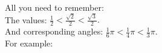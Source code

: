\documentclass[preview]{standalone}
\begin{document}
\begin{center}
All you need to remember: \\ The values: $\frac{1}{2} < \frac{\sqrt{2}}{2} < \frac{\sqrt{3}}{2}.$ \\ And corresponding angles: $ \frac{1}{6} \pi < \frac{1}{4} \pi < \frac{1}{3} \pi. $ \\ For example:
\end{center}
\end{document}
